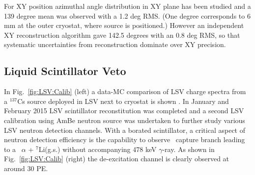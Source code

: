 For XY position azimuthal angle distribution in XY plane has been studied and a 139 degree mean was observed with a 1.2 deg RMS. (One degree corresponds to 6 mm at the outer cryostat, where source is positioned.) However an independent XY reconstruction algorithm gave 142.5 degrees with an 0.8 deg RMS, so that systematic uncertainties from reconstruction dominate over XY precision. %



\subsection{Liquid Scintillator Veto}\label{sec:LSV:gammasources}

In Fig.~\ref{fig:LSV:Calib} (left) a data-MC comparison of LSV charge spectra from a $^{137}$Cs source deployed in LSV next to cryostat is shown \cite{DS50:G4DS:paper}.
In January and February 2015 LSV scintillator reconstitution was completed and a second LSV calibration using AmBe neutron source was undertaken to further study various LSV neutron detection channels. With a borated scintillator, a critical aspect of neutron detection efficiency is the capability to observe \brbortenground\ capture branch leading to a \enbortengroundalpha\ $\alpha$ + $^7$Li(g.s.) without accompanying 478 keV $\gamma$-ray. As shown in Fig.~\ref{fig:LSV:Calib} (right) the de-excitation channel is clearly observed at around 30 PE.

